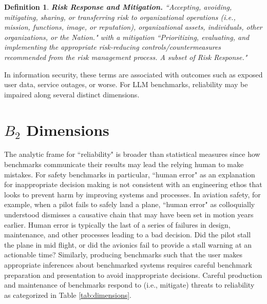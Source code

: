\documentclass{article}
\newtheorem{dfn}{Definition}[section]
\newcommand\bb{$B_2$ }
\begin{document}
\begin{dfn}
{\bf Risk Response and Mitigation.} ``Accepting, avoiding, mitigating, sharing, or transferring risk to organizational operations (i.e., mission, functions, image, or reputation), organizational assets, individuals, other organizations, or the Nation." \cite{joint2011sp} with a mitigation ``Prioritizing, evaluating, and implementing the appropriate risk-reducing controls/countermeasures recommended from the risk management process. A subset of Risk Response." \cite{cnssi4009}
\end{dfn}

In information security, these terms are associated with outcomes such as exposed user data, service outages, or worse. For LLM benchmarks, reliability may be impaired along several distinct dimensions.
\section{\texorpdfstring{\bb}{B2} Dimensions}
The analytic frame for ``reliability" is broader than statistical measures since how benchmarks communicate their results may lead the relying human to make mistakes. For safety benchmarks in particular, ``human error" as an explanation for inappropriate decision making is not consistent with an engineering ethos that looks to prevent harm by improving systems and processes. In aviation safety, for example, when a pilot fails to safely land a plane, ``human error" as colloquially understood dismisses a causative chain that may have been set in motion years earlier. Human error is typically the last of a series of failures in design, maintenance, and other processes leading to a bad decision. Did the pilot stall the plane in mid flight, or did the avionics fail to provide a stall warning at an actionable time? Similarly, producing benchmarks such that the user makes appropriate inferences about benchmarked systems requires careful benchmark preparation and presentation to avoid inappropriate decisions. Careful production and maintenance of benchmarks respond to (i.e., mitigate) threats to reliability as categorized in Table \ref{tab:dimensions}.
\end{document}
